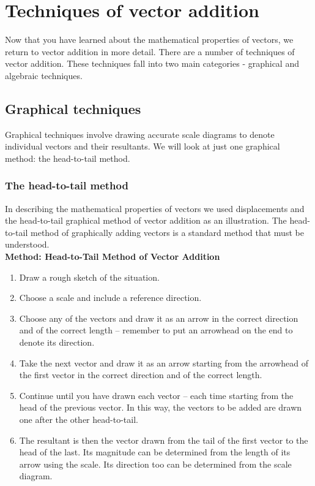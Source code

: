 \section{Techniques of vector addition}

Now that you have learned about the mathematical properties of
vectors, we return to vector addition in more detail. There are a number of
techniques of vector addition. These techniques fall into two main categories - graphical and algebraic techniques.

\subsection*{Graphical techniques}
Graphical techniques involve drawing accurate scale diagrams to denote
individual vectors and their resultants. We will look at just one graphical method: the head-to-tail method.

\subsubsection*{The head-to-tail method}
In describing the mathematical properties of vectors we used
displacements and the head-to-tail graphical method of vector addition
as an illustration. The head-to-tail method of graphically adding vectors is a standard method that must be understood.\\

\textbf{Method: Head-to-Tail Method of Vector Addition}
\begin{enumerate}[noitemsep, label=\textbf{\arabic*}.]
\item{Draw a rough sketch of the situation.}
\item{Choose a scale and include a reference direction.}
\item{Choose any of the vectors and draw it as an arrow in the
correct direction and of the correct length -- remember to put an
arrowhead on the end to denote its direction.}
\item{Take the next vector and draw it as an arrow starting from the
arrowhead of the first vector in the correct direction and of the
correct length.}
\item{Continue until you have drawn each vector -- each time starting
from the head of the previous vector. In this way, the vectors to be
added are drawn one after the other head-to-tail.}
\item{The resultant is then the vector drawn from the tail of the
first vector to the head of the last. Its magnitude can be
determined from the length of its arrow using the scale. Its
direction too can be determined from the scale diagram.}
\end{enumerate} \par


